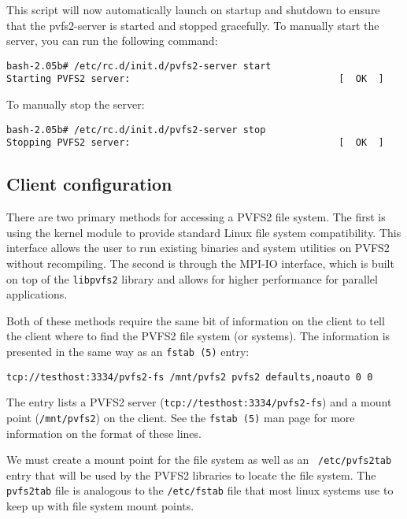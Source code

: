 \documentclass[11pt, letterpaper]{article}
\begin{document}
This script will now automatically launch on startup and shutdown to 
ensure that the pvfs2-server is started and stopped gracefully.
To manually start the server, you can run the following command:

\begin{verbatim}
bash-2.05b# /etc/rc.d/init.d/pvfs2-server start
Starting PVFS2 server:                                     [  OK  ]
\end{verbatim}

To manually stop the server:

\begin{verbatim}
bash-2.05b# /etc/rc.d/init.d/pvfs2-server stop
Stopping PVFS2 server:                                     [  OK  ]
\end{verbatim}

\subsection{Client configuration}
\label{subsec:client}

There are two primary methods for accessing a PVFS2 file system.  The first is
using the kernel module to provide standard Linux file system compatibility.
This interface allows the user to run existing binaries and system utilities
on PVFS2 without recompiling.  The second is through the MPI-IO interface,
which is built on top of the \texttt{libpvfs2} library and allows for higher
performance for parallel applications.

Both of these methods require the same bit of information on the client to
tell the client where to find the PVFS2 file system (or systems).  The
information is presented in the same way as an \texttt{fstab (5)} entry:

\begin{verbatim}
tcp://testhost:3334/pvfs2-fs /mnt/pvfs2 pvfs2 defaults,noauto 0 0 
\end{verbatim}

The entry lists a PVFS2 server (\texttt{tcp://testhost:3334/pvfs2-fs}) and a
mount point (\texttt{/mnt/pvfs2}) on the client.  See the \texttt{fstab (5)}
man page for more information on the format of these lines.

We must create a mount point for the file system as well as an {\tt
/etc/pvfs2tab} entry that will be used by the PVFS2 libraries to
locate the file system.  The {\tt pvfs2tab} file is analogous to the
{\tt /etc/fstab} file that most linux systems use to keep up with file
system mount points.
\end{document}
